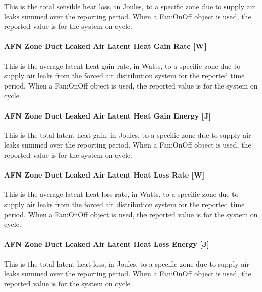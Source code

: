 This is the total sensible heat loss, in Joules, to a specific zone due to supply air leaks summed over the reporting period. When a Fan:OnOff object is used, the reported value is for the system on cycle.

\paragraph{AFN Zone Duct Leaked Air Latent Heat Gain Rate {[}W{]}}\label{afn-zone-duct-leaked-air-latent-heat-gain-rate-w}

This is the average latent heat gain rate, in Watts, to a specific zone due to supply air leaks from the forced air distribution system for the reported time period. When a Fan:OnOff object is used, the reported value is for the system on cycle.

\paragraph{AFN Zone Duct Leaked Air Latent Heat Gain Energy {[}J{]}}\label{afn-zone-duct-leaked-air-latent-heat-gain-energy-j}

This is the total latent heat gain, in Joules, to a specific zone due to supply air leaks summed over the reporting period. When a Fan:OnOff object is used, the reported value is for the system on cycle.

\paragraph{AFN Zone Duct Leaked Air Latent Heat Loss Rate {[}W{]}}\label{afn-zone-duct-leaked-air-latent-heat-loss-rate-w}

This is the average latent heat loss rate, in Watts, to a specific zone due to supply air leaks from the forced air distribution system for the reported time period. When a Fan:OnOff object is used, the reported value is for the system on cycle.

\paragraph{AFN Zone Duct Leaked Air Latent Heat Loss Energy {[}J{]}}\label{afn-zone-duct-leaked-air-latent-heat-loss-energy-j}

This is the total latent heat loss, in Joules, to a specific zone due to supply air leaks summed over the reporting period. When a Fan:OnOff object is used, the reported value is for the system on cycle.

